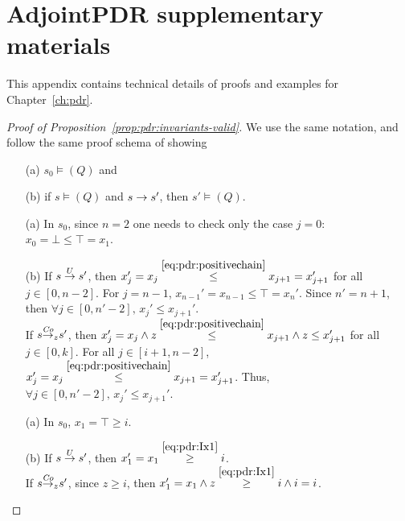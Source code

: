 
\chapter{AdjointPDR supplementary materials}\label{ch:app:pdr}
This appendix contains technical details of proofs and examples for Chapter~\ref{ch:pdr}.

\begin{proof}[Proof of Proposition~\ref{prop:pdr:invariants-valid}]
	We use the same notation, and follow the same proof schema of showing
	\begin{itemize}
		\item[(a)] $s_0 \models (Q)$ and
		\item[(b)] if $s \models (Q)$ and $s \stackrel{ }{\to} s'$, then $s'\models (Q)$.
	\end{itemize}

	\begin{itemize}
		\item[(a)] In $s_0$, since $n=2$ one needs to check only the case $j=0$: $x_{0} = \bot \leq \top =x_1 $.
		\item[(b)] If $s \stackrel{U}{\to} s'$, then $x_j' =x_j \stackrel{{\eqref{eq:pdr:positivechain}}}{\leq}  x_{j+1} =x_{j+1}'$ for all $j\in[0,n-2]$. For $j=n-1$, $x_{n-1}' =x_{n-1} \leq \top =x_{n}'$. Since $n'=n+1$, then $\forall j\in [0,n'-2] \text{, } x_j'\leq x_{j+1}'$.\\
		      If $s {\stackrel{\mathit{Co}}{\to}}_{z} s'$, then $x_j' = x_j \land z \stackrel{{\eqref{eq:pdr:positivechain}}}{\leq} x_{j+1} \land z \leq x_{j+1}'$ for all $j\in[0,k]$.
		      For all $j\in [i+1,n-2]$, $x_j' = x_j \stackrel{{\eqref{eq:pdr:positivechain}}}{\leq} x_{j+1}  =x_{j+1}'$. Thus, $\forall j\in [0,n'-2] \text{, } x_j'\leq x_{j+1}'$.
	\end{itemize}

	\begin{itemize}
		\item[(a)] In $s_0$, $x_1 = \top \geq i$.
		\item[(b)] If $s \stackrel{U}{\to} s'$, then $x_1'=x_1 \stackrel{{\eqref{eq:pdr:Ix1}}}{\geq} i$. \\
		      If $s {\stackrel{\mathit{Co}}{\to}}_{z} s'$, since $z\geq i$,  then $x_1' = x_1\land z \stackrel{{\eqref{eq:pdr:Ix1}}}{\geq} i\land i = i$.
	\end{itemize}


\end{proof}
